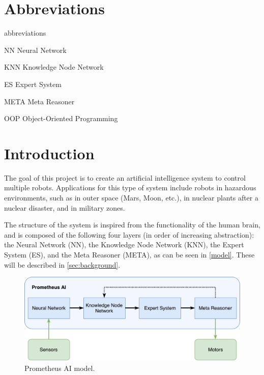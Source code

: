 \documentclass[titlepage,11pt]{article}
\begin{document}
\clearpage
\tableofcontents

\listoffigures
\listoftables
\lstlistoflistings
\clearpage

\twocolumn

\section*{Abbreviations}

\begin{labeling}{abbreviations}
\item [NN] Neural Network
\item [KNN] Knowledge Node Network
\item [ES] Expert System
\item [META] Meta Reasoner
\item [OOP] Object-Oriented Programming
\end{labeling}

\section{Introduction} \label{sec:intro}

The goal of this project is to create an artificial intelligence system to control multiple robots. Applications for this type of system include robots in hazardous environments, such as in outer space (Mars, Moon, etc.), in nuclear plants after a nuclear disaster, and in military zones.

The structure of the system is inspired from the functionality of the human brain, and is composed of the following four layers (in order of increasing abstraction): the Neural Network (NN), the Knowledge Node Network (KNN), the Expert System (ES), and the Meta Reasoner (META), as can be seen in \autoref{model}. These will be described in \autoref{sec:background}.

\begin{figure}[!htb]
	\includegraphics[width=\columnwidth]{figures/ai_model.pdf}
	\caption{Prometheus AI model.}
	\label{model}
\end{figure}
\end{document}

